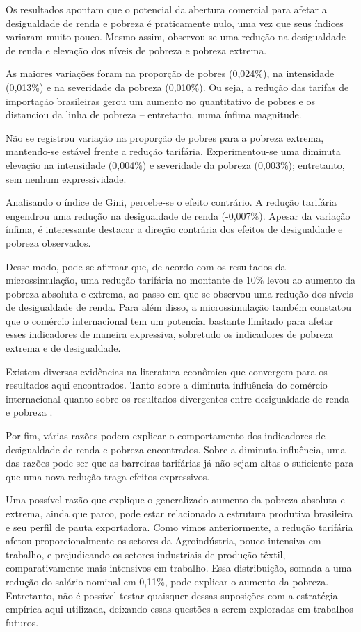 Os resultados apontam que o potencial da abertura comercial para afetar a desigualdade de renda e pobreza é praticamente nulo, uma vez que seus índices variaram muito pouco. Mesmo assim, observou-se uma redução na desigualdade de renda e elevação dos níveis de pobreza e pobreza extrema.

As maiores variações foram na proporção de pobres (0,024\%), na intensidade (0,013\%) e na severidade da pobreza (0,010\%). Ou seja, a redução das tarifas de importação brasileiras gerou um aumento no quantitativo de pobres e os distanciou da linha de pobreza -- entretanto, numa ínfima magnitude. 

Não se registrou variação na proporção de pobres para a pobreza extrema, mantendo-se estável frente a redução tarifária. Experimentou-se uma diminuta elevação na intensidade (0,004\%) e severidade da pobreza (0,003\%); entretanto, sem nenhum expressividade.

Analisando o índice de Gini, percebe-se o efeito contrário. A redução tarifária engendrou uma redução na desigualdade de renda (-0,007\%). Apesar da variação ínfima, é interessante destacar a direção contrária dos efeitos de desigualdade e pobreza observados.

Desse modo, pode-se afirmar que, de acordo com os resultados da microssimulação, uma redução tarifária no montante de 10\% levou ao aumento da pobreza absoluta e extrema, ao passo em que se observou uma redução dos níveis de desigualdade de renda. Para além disso, a microssimulação também constatou que o comércio internacional tem um potencial bastante limitado para afetar esses indicadores de maneira expressiva, sobretudo os indicadores de pobreza extrema e de desigualdade.

Existem diversas evidências na literatura econômica que convergem para os resultados aqui encontrados. Tanto sobre a diminuta influência do comércio internacional \cite{carneiro06} quanto sobre os resultados divergentes entre desigualdade de renda e pobreza \cite{borrazetal12}.

Por fim, várias razões podem explicar o comportamento dos indicadores de desigualdade de renda e pobreza encontrados. Sobre a diminuta influência, uma das razões pode ser que as barreiras tarifárias já não sejam altas o suficiente para que uma nova redução traga efeitos expressivos.

Uma possível razão que explique o generalizado aumento da pobreza absoluta e extrema, ainda que parco, pode estar relacionado a estrutura produtiva brasileira e seu perfil de pauta exportadora. Como vimos anteriormente, a redução tarifária afetou proporcionalmente os setores da Agroindústria, pouco intensiva em trabalho, e prejudicando os setores industriais de produção têxtil, comparativamente mais intensivos em trabalho. Essa distribuição, somada a uma redução do salário nominal em 0,11\%, pode explicar o aumento da pobreza. Entretanto, não é possível testar quaisquer dessas suposições com a estratégia empírica aqui utilizada, deixando essas questões a serem exploradas em trabalhos futuros.


